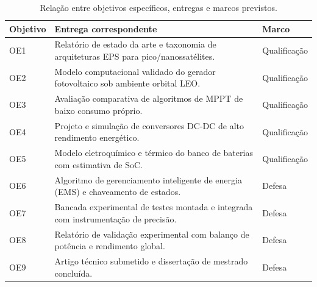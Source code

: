 \begin{table}[htbp]
\centering
\small
\caption{Relação entre objetivos específicos, entregas e marcos previstos.}
\begin{tabularx}{\textwidth}{p{1.8cm} X p{2.8cm}}
\toprule
\textbf{Objetivo} & \textbf{Entrega correspondente} & \textbf{Marco} \\
\midrule
OE1 & Relatório de estado da arte e taxonomia de arquiteturas EPS para pico/nanossatélites. & Qualificação \\
OE2 & Modelo computacional validado do gerador fotovoltaico sob ambiente orbital LEO. & Qualificação \\
OE3 & Avaliação comparativa de algoritmos de MPPT de baixo consumo próprio. & Qualificação \\
OE4 & Projeto e simulação de conversores DC-DC de alto rendimento energético. & Qualificação \\
OE5 & Modelo eletroquímico e térmico do banco de baterias com estimativa de SoC. & Qualificação \\
\midrule
OE6 & Algoritmo de gerenciamento inteligente de energia (EMS) e chaveamento de estados. & Defesa \\
OE7 & Bancada experimental de testes montada e integrada com instrumentação de precisão. & Defesa \\
OE8 & Relatório de validação experimental com balanço de potência e rendimento global. & Defesa \\
OE9 & Artigo técnico submetido e dissertação de mestrado concluída. & Defesa \\
\bottomrule
\end{tabularx}
\label{tab:objetivos_entregas}
\end{table}